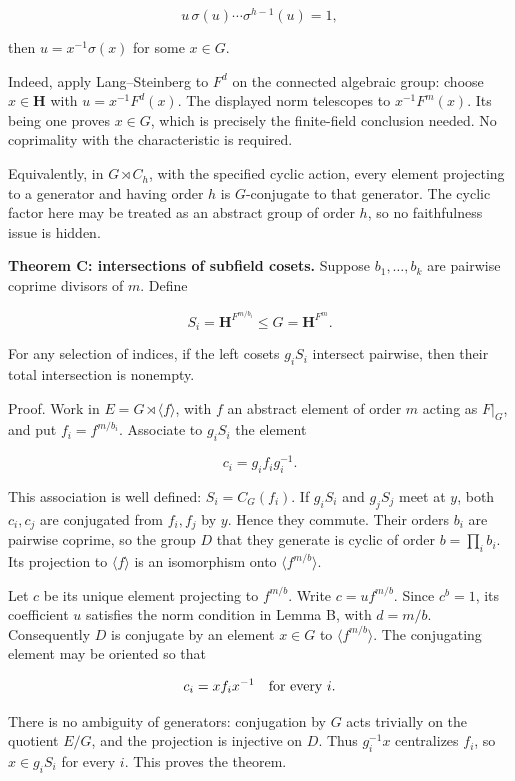 \documentclass[11pt,a4paper]{article}
\begin{document}
\[
u\,\sigma(u)\cdots\sigma^{h-1}(u)=1,
\]

then \(u=x^{-1}\sigma(x)\) for some \(x\in G\).

Indeed, apply Lang--Steinberg to \(F^d\) on the connected algebraic
group: choose \(x\in\mathbf H\) with \(u=x^{-1}F^d(x)\). The displayed
norm telescopes to \(x^{-1}F^m(x)\). Its being one proves \(x\in G\),
which is precisely the finite-field conclusion needed. No coprimality
with the characteristic is required.

Equivalently, in \(G\rtimes C_h\), with the specified cyclic action,
every element projecting to a generator and having order \(h\) is
\(G\)-conjugate to that generator. The cyclic factor here may be treated
as an abstract group of order \(h\), so no faithfulness issue is hidden.

\textbf{Theorem C: intersections of subfield cosets.} Suppose
\(b_1,\ldots,b_k\) are pairwise coprime divisors of \(m\). Define

\[
S_i=\mathbf H^{F^{m/b_i}}\le G=\mathbf H^{F^m}.
\]

For any selection of indices, if the left cosets \(g_iS_i\) intersect
pairwise, then their total intersection is nonempty.

Proof. Work in \(E=G\rtimes\langle f\rangle\), with \(f\) an abstract
element of order \(m\) acting as \(F|_G\), and put \(f_i=f^{m/b_i}\).
Associate to \(g_iS_i\) the element

\[
c_i=g_i f_i g_i^{-1}.
\]

This association is well defined: \(S_i=C_G(f_i)\). If \(g_iS_i\) and
\(g_jS_j\) meet at \(y\), both \(c_i,c_j\) are conjugated from
\(f_i,f_j\) by \(y\). Hence they commute. Their orders \(b_i\) are
pairwise coprime, so the group \(D\) that they generate is cyclic of
order \(b=\prod_i b_i\). Its projection to \(\langle f\rangle\) is an
isomorphism onto \(\langle f^{m/b}\rangle\).

Let \(c\) be its unique element projecting to \(f^{m/b}\). Write
\(c=u f^{m/b}\). Since \(c^b=1\), its coefficient \(u\) satisfies the
norm condition in Lemma B, with \(d=m/b\). Consequently \(D\) is
conjugate by an element \(x\in G\) to \(\langle f^{m/b}\rangle\). The
conjugating element may be oriented so that

\[
c_i=x f_i x^{-1}\quad\hbox{for every }i.
\]

There is no ambiguity of generators: conjugation by \(G\) acts trivially
on the quotient \(E/G\), and the projection is injective on \(D\). Thus
\(g_i^{-1}x\) centralizes \(f_i\), so \(x\in g_iS_i\) for every \(i\).
This proves the theorem.
\end{document}
